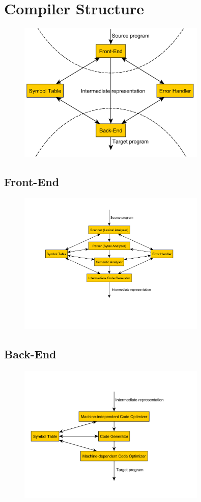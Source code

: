 \section{Compiler Structure}
\begin{figure}[H]
	\centerline{\includegraphics[width=0.8\textwidth]{img/10.pdf}}
\end{figure}

\subsection{Front-End}
\begin{figure}[H]
	\centerline{\includegraphics[width=0.8\textwidth]{img/11.pdf}}
\end{figure}

\subsection{Back-End}
\begin{figure}[H]
	\centerline{\includegraphics[width=0.8\textwidth]{img/12.pdf}}
\end{figure}